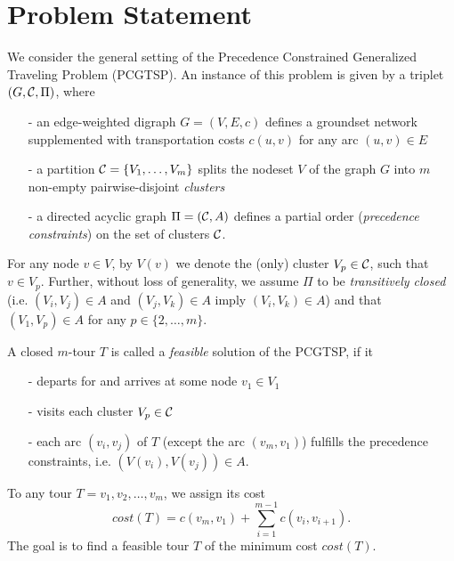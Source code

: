 \section{Problem Statement}\label{sec:PS}
We consider the general setting of the Precedence Constrained Generalized Traveling Problem (PCGTSP). An instance of this problem is given by a triplet $(G,\mathcal{C},\Pi)$, where
\begin{itemize}
	\item[-] an edge-weighted digraph $G=(V,E,c)$ defines a groundset network supplemented with transportation costs $c(u,v)$ for any arc $(u,v)\in E$
	\item[-] a partition $\mathcal{C}=\{V_1,\ldots,V_m\}$ splits the nodeset $V$ of the graph $G$ into $m$ non-empty pairwise-disjoint \textit{clusters}
	\item[-] a directed acyclic graph $\Pi=(\mathcal{C},A)$ defines a partial order (\textit{precedence constraints}) on the set of clusters $\mathcal{C}$.      
\end{itemize}

For any node $v\in V$, by $V(v)$ we denote the (only) cluster $V_p\in\mathcal{C}$, such that $v\in V_p$. Further, without loss of generality, we assume $\Pi$ to be \textit{transitively closed} (i.e.  $(V_i,V_j)\in A$ and $(V_j,V_k)\in A$ imply $(V_i,V_k)\in A$) and that $(V_1,V_p)\in A$ for any $p\in\{2,\ldots,m\}$.

A closed $m$-tour $T$ is called a \textit{feasible} solution of the PCGTSP, if it
\begin{itemize}
	\item[-] departs for and arrives at some node $v_1\in V_1$
	\item[-] visits each cluster $V_p\in\mathcal{C}$
	\item[-] each arc $(v_i, v_j)$ of  $T$ (except the arc $(v_m,v_1)$) fulfills the precedence constraints, i.e. $(V(v_i),V(v_j))\in A$.
\end{itemize} 

To any tour $T=v_1, v_2, \ldots, v_m$, we assign its cost
$$
	cost(T) = c(v_m,v_1) + \sum_{i=1}^{m-1} c(v_i,v_{i+1}). 
$$ 
The goal is to find a feasible tour $T$ of the minimum cost $cost(T)$. 
